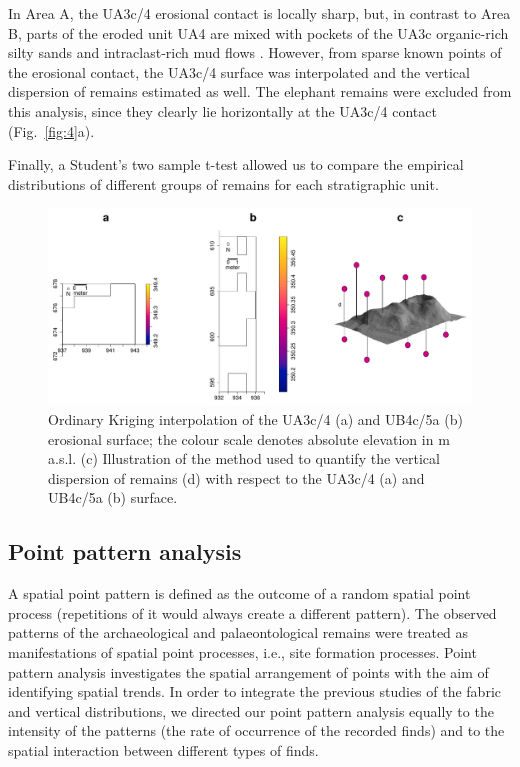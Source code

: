 \documentclass[preprint,authoryear,times]{elsarticle} %
\begin{document}
In Area A, the UA3c/4 erosional contact is locally sharp, but, in contrast to Area B, parts of the eroded unit UA4 are mixed with pockets of the UA3c organic-rich silty sands and intraclast-rich mud flows \citep{Karkanas}. However, from sparse known points of the erosional contact, the UA3c/4 surface was interpolated and the vertical dispersion of remains estimated as well. The elephant remains were excluded from this analysis, since they clearly lie horizontally at the UA3c/4 contact (Fig.~\ref{fig:4}a). %

Finally, a Student's two sample t-test allowed us to compare the empirical distributions of different groups of remains for each stratigraphic unit.

\begin{figure}[]
  \centering
  \includegraphics[width=1\textwidth]{../artwork/Fig5.pdf}
  \caption{Ordinary Kriging interpolation of the UA3c/4 (a) and UB4c/5a (b) erosional surface; the colour scale denotes absolute elevation in m a.s.l. (c) Illustration of the method used to quantify the vertical dispersion of remains (d) with respect to the UA3c/4 (a) and UB4c/5a (b) surface.}
  \label{fig:5}
\end{figure}

\subsection{Point pattern analysis}

A spatial point pattern is defined as the outcome of a random spatial point process (repetitions of it would always create a different pattern). The observed patterns of the archaeological and palaeontological remains were treated as manifestations of spatial point processes, i.e., site formation processes. Point pattern analysis investigates the spatial arrangement of points with the aim of identifying spatial trends. In order to integrate the previous studies of the fabric and vertical distributions, we directed our point pattern analysis equally to the intensity of the patterns (the rate of occurrence of the recorded finds) and to the spatial interaction between different types of finds.
\end{document}
